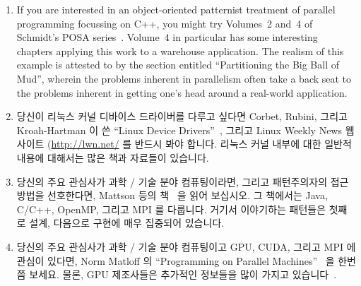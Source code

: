 \begin{enumerate}
\item	If you are interested in an object-oriented patternist
	treatment of parallel programming focussing on C++,
	you might try Volumes~2 and~4 of Schmidt's POSA
	series~\cite{SchmidtStalRohnertBuschmann2000v2Textbook,
	BuschmannHenneySchmidt2007v4Textbook}.
	Volume~4 in particular has some interesting chapters
	applying this work to a warehouse application.
	The realism of this example is attested to by
	the section entitled ``Partitioning the Big Ball of Mud'',
	wherein the problems inherent in parallelism often
	take a back seat to the problems inherent in getting
	one's head around a real-world application.
\fi
\item	당신이 리눅스 커널 디바이스 드라이버를 다루고 싶다면 Corbet, Rubini,
	그리고 Kroah-Hartman 이 쓴
	``Linux Device Drivers''~\cite{CorbetRubiniKroahHartman}, 그리고 Linux
	Weekly News 웹사이트 (\url{http://lwn.net/} 를 반드시 봐야 합니다.
	리눅스 커널 내부에 대한 일반적 내용에 대해서는 많은 책과 자료들이
	있습니다.
\iffalse

\item	If you want to work with Linux-kernel device drivers,
	then Corbet's, Rubini's, and Kroah-Hartman's
	``Linux Device Drivers''~\cite{CorbetRubiniKroahHartman}
	is indispensable, as is the Linux Weekly News web site
	(\url{http://lwn.net/}).
	There is a large number of books and resources on
	the more general topic of Linux kernel internals.
\fi
\item	당신의 주요 관심사가 과학 / 기술 분야 컴퓨팅이라면, 그리고 패턴주의자의
	접근방법을 선호한다면, Mattson 등의 책~\cite{Mattson2005Textbook} 을
	읽어 보십시오.
	그 책에서는 Java, C/C++, OpenMP, 그리고 MPI 를 다룹니다.
	거기서 이야기하는 패턴들은 첫째로 설계, 다음으로 구현에 매우 집중되어
	있습니다.
\iffalse

\item	If your primary focus is scientific and technical computing,
	and you prefer a patternist approach,
	you might try Mattson et al.'s
	textbook~\cite{Mattson2005Textbook}.
	It covers Java, C/C++, OpenMP, and MPI.
	Its patterns are admirably focused first on design,
	then on implementation.
\fi
\item	당신의 주요 관심사가 과학 / 기술 분야 컴퓨팅이고 GPU, CUDA, 그리고 MPI
	에 관심이 있다면, Norm Matloff 의 ``Programming on Parallel
	Machines''~\cite{NormMatloff2013ParProcBook} 을 한번쯤 보세요.
	물론, GPU 제조사들은 추가적인 정보들을 많이 가지고
	있습니다~\cite{AMD2017OpenCL,NVidia2017GPGPU,NVidia2017GPGPU-university}.
\iffalse


\end{enumerate}
